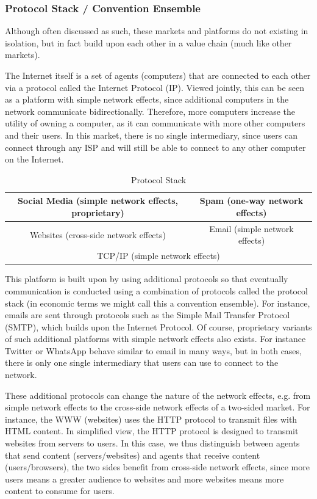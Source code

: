 \documentclass[a4paper,british]{article}\usepackage[]{graphicx}\usepackage[]{color}
\providecommand{\tabularnewline}{\\}
\begin{document}
\subsubsection*{Protocol Stack / Convention Ensemble}

Although often discussed as such, these markets and platforms do not
existing in isolation, but in fact build upon each other in a value
chain (much like other markets).

The Internet itself is a set of agents (computers) that are connected
to each other via a protocol called the Internet Protocol (IP). Viewed
jointly, this can be seen as a platform with simple network effects,
since additional computers in the network communicate bidirectionally.
Therefore, more computers increase the utility of owning a computer,
as it can communicate with more other computers and their users. In
this market, there is no single intermediary, since users can connect
through any ISP and will still be able to connect to any other computer
on the Internet.

\begin{table}[H]
\caption{Protocol Stack}

\centering{}%
\begin{tabular}{|c|c|}
\hline 
Social Media (simple network effects, proprietary) &
Spam (one-way network effects)\tabularnewline
\hline 
Websites (cross-side network effects) &
Email (simple network effects)\tabularnewline
\hline 
\multicolumn{2}{|c|}{TCP/IP (simple network effects)}\tabularnewline
\hline 
\end{tabular}
\end{table}

This platform is built upon by using additional protocols so that
eventually communication is conducted using a combination of protocols
called the protocol stack (in economic terms we might call this a
\textquotedbl{}convention ensemble\textquotedbl{}). For instance,
emails are sent through protocols such as the Simple Mail Transfer
Protocol (SMTP), which builds upon the Internet Protocol. Of course,
proprietary variants of such additional platforms with simple network
effects also exists. For instance Twitter or WhatsApp behave similar
to email in many ways, but in both cases, there is only one single
intermediary that users can use to connect to the network.

These additional protocols can change the nature of the network effects,
e.g. from simple network effects to the cross-side network effects
of a two-sided market. For instance, the WWW (websites) uses the HTTP
protocol to transmit files with HTML content. In simplified view,
the HTTP protocol is designed to transmit websites from servers to
users. In this case, we thus distinguish between agents that send
content (servers/websites) and agents that receive content (users/browsers),
the two sides benefit from cross-side network effects, since more
users means a greater audience to websites and more websites means
more content to consume for users.
\end{document}
